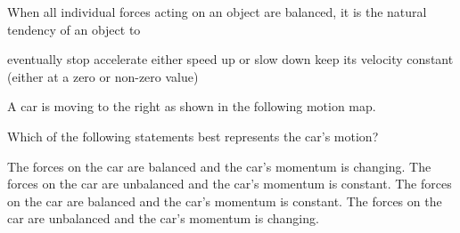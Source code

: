 \documentclass[answers]{exam}
\begin{document}
\begin{questions}


\question 
When all individual forces acting on an object are balanced, it is the natural tendency of an object to 

\begin{randomizechoices}
    \choice eventually stop
    \choice accelerate
    \choice either speed up or slow down
    \correctchoice keep its velocity constant (either at a zero or non-zero value)
\end{randomizechoices}

\question 
A car is moving to the right as shown in the following motion map. 

\begin{center}
\end{center}

Which of the following statements best represents the car’s motion?

\begin{randomizechoices}
    \choice The forces on the car are balanced and the car’s momentum is changing.			
    \choice The forces on the car are unbalanced and the car’s momentum is constant.
    \choice The forces on the car are balanced and the car’s momentum is constant.
    \correctchoice The forces on the car are unbalanced and the car’s momentum is changing.
\end{randomizechoices}


\end{questions}
\end{document}
